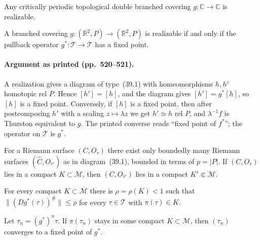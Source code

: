 \begin{theorem}
\label{thm:lyubich-thurston-realization}
Any critically periodic topological double branched covering $g\colon\mathbb C\to\mathbb C$ is realizable.
\end{theorem}

\begin{proposition}
\label{prop:lyubich-fixed-point}
A branched covering $g\colon(\mathbb R^2,P)\to(\mathbb R^2,P)$ is realizable if and only if the pullback
operator $g^*\colon\mathcal T\to\mathcal T$ has a fixed point.
\end{proposition}

\paragraph{Argument as printed (pp.~520--521).}
A realization gives a diagram of type~(39.1) with homeomorphisms $h,h'$ homotopic rel $P$.  Hence
$[h']=[h]$, and the diagram gives $[h']=g^*[h]$, so $[h]$ is a fixed point.  Conversely, if $[h]$ is a fixed
point, then after postcomposing $h'$ with a scaling $z\mapsto\lambda z$ we get $h'\simeq h$ rel $P$, and
$\lambda^{-1}f$ is Thurston equivalent to $g$.  The printed converse reads ``fixed point of $f^*$''; the
operator on $\mathcal T$ is $g^*$.

\begin{lemma}
\label{lem:lyubich-39-1}
For a Riemann surface $(C,O_\tau)$ there exist only boundedly many Riemann surfaces $(\hat C,O_{\tau'})$ as
in diagram~(39.1), bounded in terms of $p=|P|$.  If $(C,O_\tau)$ lies in a compact $K\subset\mathcal M$, then
$(C,O_{\tau'})$ lies in a compact $K'\Subset\mathcal M$.
\end{lemma}

\begin{lemma}
\label{lem:lyubich-39-4}
For every compact $K\subset\mathcal M$ there is $\rho=\rho(K)<1$ such that $\|(Dg^*(\tau))^{\#}\|\le\rho$ for
every $\tau\in\mathcal T$ with $\pi(\tau)\in K$.
\end{lemma}

\begin{corollary}
\label{cor:lyubich-39-5}
Let $\tau_n=(g^*)^n\tau$.  If $\pi(\tau_n)$ stays in some compact $K\subset\mathcal M$, then $(\tau_n)$
converges to a fixed point of $g^*$.
\end{corollary}

